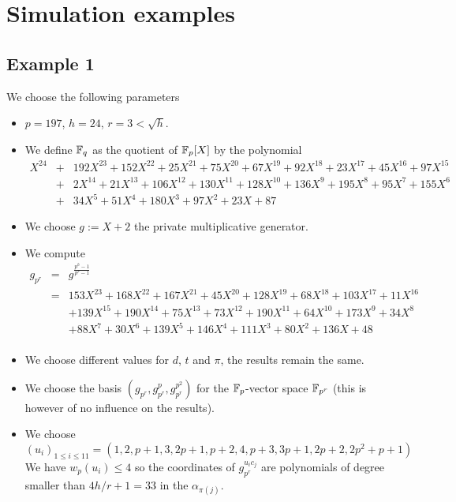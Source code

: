 \documentclass[a4paper]{article}
\begin{document}
\newpage
\section{Simulation examples}

\subsection{Example 1}
\label{Ex:1}

We choose the following parameters
\begin{itemize}
\item $p = 197$, $h = 24$, $r = 3 < \sqrt{h}$.
\item We define $\mathbb{F}_q$ as the quotient of $\mathbb{F}_p[X]$ by the polynomial
\begin{eqnarray*}
X^{24} &+& 192X^{23} + 152X^{22} + 25X^{21} + 75X^{20} + 67X^{19} + 92X^{18} + 23X^{17} + 45X^{16} + 97X^{15} \\
 &+& 2X^{14} + 21X^{13} + 106X^{12} + 130X^{11} + 128X^{10} + 136X^9 + 195X^8 + 95X^7 + 155X^6 \\
 &+& 34X^5 + 51X^4 + 180X^3 + 97X^2 + 23X + 87
\end{eqnarray*}
\item We choose $g := X + 2$ the private multiplicative generator.
\item We compute
\begin{eqnarray*}
g_{p^r} &=& g^{\frac{p^h-1}{p^r-1}} \\
&=& 153X^{23} + 168X^{22} + 167X^{21} + 45X^{20} + 128X^{19} + 68X^{18} + 103X^{17} + 11X^{16}\\
&&+ 139X^{15} + 190X^{14} + 75X^{13} + 73X^{12} + 190X^{11} + 64X^{10} + 173X^9 + 34X^8 \\
&&+ 88X^7 + 30X^6 + 139X^5 + 146X^4 + 111X^3 + 80X^2 + 136X + 48\\
\end{eqnarray*}
\item We choose different values for $d$, $t$ and $\pi$, the results remain the same.
\item We choose the basis $\left(g_{p^r}, g_{p^r}^p, g_{p^r}^{p^2} \right)$ for the $\mathbb{F}_p$-vector space $\mathbb{F}_{p^r}$ (this is however of no influence on the results).
\item We choose $(u_i)_{1\leq  i \leq 11} = (1,2,p+1,3,2p+1,p+2,4,p+3,3p+1,2p+2,2p^2+p+1)$\\
We have $w_p(u_i) \leq 4$ so the coordinates of $g_{p^r}^{u_i c_j}$ are polynomials of degree smaller than $4 h/r+1 = 33$ in the $\alpha_{\pi(j)}$.
\end{itemize}
\end{document}
